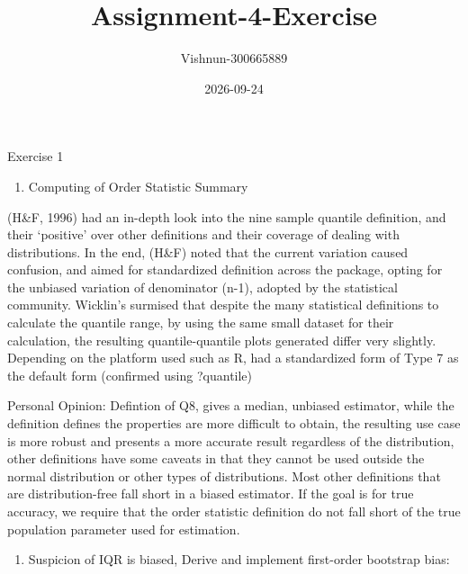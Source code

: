 \documentclass[
]{article}
\title{Assignment-4-Exercise}
\author{Vishnun-300665889}
\date{2026-09-24}
\providecommand{\tightlist}{%
  \setlength{\itemsep}{0pt}\setlength{\parskip}{0pt}}
\begin{document}
\maketitle

Exercise 1

\begin{enumerate}
\def\labelenumi{\arabic{enumi}.}
\tightlist
\item
  Computing of Order Statistic Summary
\end{enumerate}

(H\&F, 1996) had an in-depth look into the nine sample quantile
definition, and their `positive' over other definitions and their
coverage of dealing with distributions. In the end, (H\&F) noted that
the current variation caused confusion, and aimed for standardized
definition across the package, opting for the unbiased variation of
denominator (n-1), adopted by the statistical community. Wicklin's
surmised that despite the many statistical definitions to calculate the
quantile range, by using the same small dataset for their calculation,
the resulting quantile-quantile plots generated differ very slightly.
Depending on the platform used such as R, had a standardized form of
Type 7 as the default form (confirmed using ?quantile)

Personal Opinion: Defintion of Q8, gives a median, unbiased estimator,
while the definition defines the properties are more difficult to
obtain, the resulting use case is more robust and presents a more
accurate result regardless of the distribution, other definitions have
some caveats in that they cannot be used outside the normal distribution
or other types of distributions. Most other definitions that are
distribution-free fall short in a biased estimator. If the goal is for
true accuracy, we require that the order statistic definition do not
fall short of the true population parameter used for estimation.

\begin{enumerate}
\def\labelenumi{\arabic{enumi}.}
\setcounter{enumi}{1}
\tightlist
\item
  Suspicion of IQR is biased, Derive and implement first-order bootstrap
  bias:
\end{enumerate}
\end{document}
